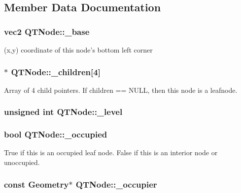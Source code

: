 \subsection{Member Data Documentation}
\hypertarget{class_q_t_node_a363a5d722a667387d637aa5dc1c7789d}{
\subsubsection[{\+\_\+base}]{\setlength{\rightskip}{0pt plus 5cm}vec2 Q\+T\+Node\+::\+\_\+base}}\label{class_q_t_node_a363a5d722a667387d637aa5dc1c7789d}


(x,y) coordinate of this node's bottom left corner 

\hypertarget{class_q_t_node_ab908d2ab924e7e53f2a1d0d8373833d2}{
\subsubsection[{\+\_\+children}]{$\ast$ Q\+T\+Node\+::\+\_\+children\mbox{[}4\mbox{]}}}\label{class_q_t_node_ab908d2ab924e7e53f2a1d0d8373833d2}
Array of 4 child pointers. If children == N\+U\+L\+L, then this node is a leafnode. \hypertarget{class_q_t_node_a80d41a086f3020f670732d0c7971afb0}{
\subsubsection[{\+\_\+level}]{\setlength{\rightskip}{0pt plus 5cm}unsigned int Q\+T\+Node\+::\+\_\+level}}\label{class_q_t_node_a80d41a086f3020f670732d0c7971afb0}
\hypertarget{class_q_t_node_ae8721982666788f10f11d4545a77bf61}{
\subsubsection[{\+\_\+occupied}]{\setlength{\rightskip}{0pt plus 5cm}bool Q\+T\+Node\+::\+\_\+occupied}}\label{class_q_t_node_ae8721982666788f10f11d4545a77bf61}
True if this is an occupied leaf node. False if this is an interior node or unoccupied. \hypertarget{class_q_t_node_aa61ac86e1264835162e6101d70b7883e}{
\subsubsection[{\+\_\+occupier}]{\setlength{\rightskip}{0pt plus 5cm}const {\bf Geometry}$\ast$ Q\+T\+Node\+::\+\_\+occupier}}\label{class_q_t_node_aa61ac86e1264835162e6101d70b7883e}
